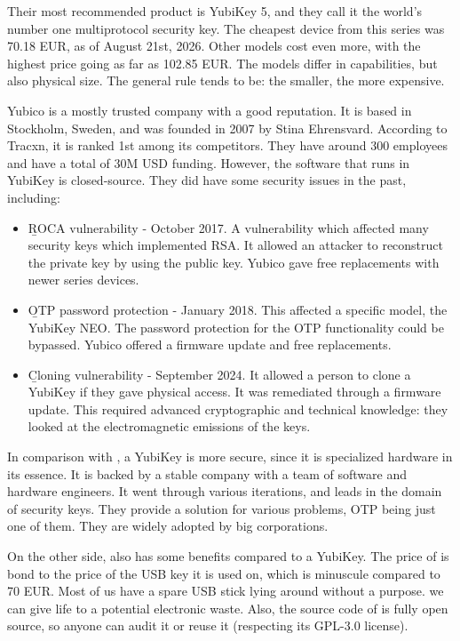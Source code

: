 Their most recommended product is YubiKey 5, and they call it the world's number one multiprotocol security key.
The cheapest device from this series was 70.18 EUR, as of August 21st, 2026.
Other models cost even more, with the highest price going as far as 102.85 EUR.
The models differ in capabilities, but also physical size.
The general rule tends to be: the smaller, the more expensive.

Yubico is a mostly trusted company with a good reputation.
It is based in Stockholm, Sweden, and was founded in 2007 by Stina Ehrensvard.
According to Tracxn, it is ranked 1st among its competitors\cite{yubico-company}.
They have around 300 employees and have a total of 30M USD funding.
However, the software that runs in YubiKey is closed-source.
They did have some security issues in the past\cite{yubikey-issues}, including:
\begin{itemize}
    \item \b{ROCA vulnerability - October 2017}.
        A vulnerability which affected many security keys which implemented RSA.
        It allowed an attacker to reconstruct the private key by using the public key.
        Yubico gave free replacements with newer series devices.
    \item \b{OTP password protection - January 2018}.
        This affected a specific model, the YubiKey NEO.
        The password protection for the OTP functionality could be bypassed.
        Yubico offered a firmware update and free replacements.
    \item \b{Cloning vulnerability - September 2024}.
        It allowed a person to clone a YubiKey if they gave physical access.
        It was remediated through a firmware update.
        This required advanced cryptographic and technical knowledge: they looked at the electromagnetic emissions of the keys.\cite{eukleak}
\end{itemize}

In comparison with \app{}, a YubiKey is more secure, since it is specialized hardware in its essence.
It is backed by a stable company with a team of software and hardware engineers.
It went through various iterations, and leads in the domain of security keys.
They provide a solution for various problems, OTP being just one of them.
They are widely adopted by big corporations.

On the other side, \app{} also has some benefits compared to a YubiKey.
The price of \app{} is bond to the price of the USB key it is used on, which is minuscule compared to 70 EUR.
Most of us have a spare USB stick lying around without a purpose.
\app{} we can give life to a potential electronic waste.
Also, the source code of \app{} is fully open source, so anyone can audit it or reuse it (respecting its GPL-3.0 license).

